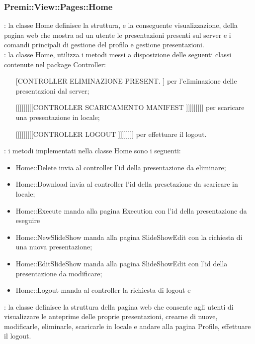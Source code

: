 {		\subsubsection{Premi::View::Pages::Home}{
			\textbf{\tipo}: la classe Home definisce la struttura, e la conseguente visualizzazione, della pagina web che mostra ad un utente le presentazioni presenti sul server e i comandi principali di gestione del profilo e gestione presentazioni.\\	
			\textbf{\relaz}: la classe Home, utilizza i metodi messi a disposizione delle seguenti classi contenute nel package Controller: 
			\begin{itemize}
				\item [[CONTROLLER ELIMINAZIONE PRESENT.]] per l'eliminazione delle presentazioni dal server;
				\item [[[[[[[[[[CONTROLLER SCARICAMENTO MANIFEST]]]]]]]]]] per scaricare una presentazione in locale;
				\item [[[[[[[[[[CONTROLLER LOGOUT]]]]]]]]] per effettuare il logout.
			\end{itemize} 
			\textbf{\interfacce}: i metodi implementati nella classe Home sono i seguenti:
			\begin{itemize}
				\item Home::Delete invia al controller l'id della presentazione da eliminare;
				\item Home::Download invia al controller l'id della presetazione da scaricare in locale;
				\item Home::Execute manda alla pagina Execution con l'id della presentazione da eseguire
				\item Home::NewSlideShow manda alla pagina SlideShowEdit con la richiesta di una nuova presentazione;
				\item Home::EditSlideShow manda alla pagina SlideShowEdit con l'id della presentazione da modificare;
				\item Home::Logout manda al controller la richiesta di logout e 				
			\end{itemize} 
			\textbf{\attivita}: la classe definisce la struttura della pagina web che consente agli utenti di visualizzare le anteprime delle proprie presentazioni, crearne di nuove, modificarle, eliminarle, scaricarle in locale e andare alla pagina Profile, effettuare il logout.\\
		}
}
